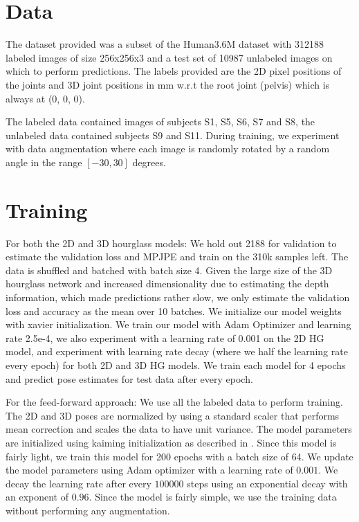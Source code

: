 \documentclass[sigconf]{acmart}
\begin{document}
\section{Data}
\quad The dataset provided was a subset of the Human3.6M dataset with 312188 labeled images of size 256x256x3 and a test set of 10987 unlabeled images on which to perform predictions. The labels provided are the 2D pixel positions of the joints and 3D joint positions in mm w.r.t the root joint (pelvis) which is always at (0, 0, 0).

The labeled data contained images of subjects S1, S5, S6, S7 and S8, the unlabeled data contained subjects S9 and S11. During training, we experiment with data augmentation where each image is randomly rotated by a random angle in the range $[-30, 30]$ degrees.

\section{Training}
\quad For both the 2D and 3D hourglass models: We hold out 2188 for validation to estimate the validation loss and MPJPE and train on the 310k samples left. The data is shuffled and batched with batch size 4. Given the large size of the 3D hourglass network and increased dimensionality due to estimating the depth information, which made predictions rather slow, we only estimate the validation loss and accuracy as the mean over 10 batches. We initialize our model weights with xavier initialization. We train our model with Adam Optimizer and learning rate 2.5e-4, we also experiment with a learning rate of 0.001 on the 2D HG model, and experiment with learning rate decay (where we half the learning rate every epoch) for both 2D and 3D HG models. We train each model for 4 epochs and predict pose estimates for test data after every epoch.

For the feed-forward approach: We use all the labeled data to perform training. The 2D and 3D poses are normalized by using a standard scaler that performs mean correction and scales the data to have unit variance. The model parameters are initialized using kaiming initialization as described in \cite{kaim}. Since this model is fairly light, we train this model for 200 epochs with a batch size of 64. We update the model parameters using Adam optimizer with a learning rate of $0.001$. We decay the learning rate after every $100000$ steps using an exponential decay with an exponent of $0.96$. Since the model is fairly simple, we use the training data without performing any augmentation.
\end{document}
